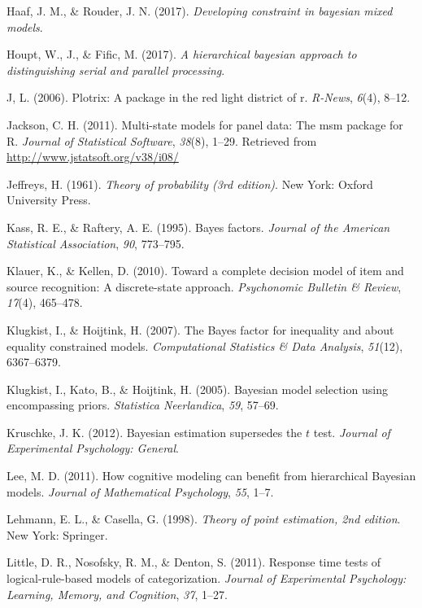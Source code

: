 \documentclass[english,man]{apa6}
\theoremstyle{definition}
\theoremstyle{definition}
\theoremstyle{remark}
\begin{document}
\hypertarget{ref-Haaf:Rouder:2017}{}
Haaf, J. M., \& Rouder, J. N. (2017). \emph{Developing constraint in
bayesian mixed models}.

\hypertarget{ref-Houpt:Fific:2017}{}
Houpt, W., J., \& Fific, M. (2017). \emph{A hierarchical bayesian
approach to distinguishing serial and parallel processing}.

\hypertarget{ref-R-plotrix}{}
J, L. (2006). Plotrix: A package in the red light district of r.
\emph{R-News}, \emph{6}(4), 8--12.

\hypertarget{ref-R-msm}{}
Jackson, C. H. (2011). Multi-state models for panel data: The msm
package for R. \emph{Journal of Statistical Software}, \emph{38}(8),
1--29. Retrieved from \url{http://www.jstatsoft.org/v38/i08/}

\hypertarget{ref-Jeffreys:1961}{}
Jeffreys, H. (1961). \emph{Theory of probability (3rd edition)}. New
York: Oxford University Press.

\hypertarget{ref-Kass:Raftery:1995}{}
Kass, R. E., \& Raftery, A. E. (1995). Bayes factors. \emph{Journal of
the American Statistical Association}, \emph{90}, 773--795.

\hypertarget{ref-Klauer:Kellen:2010}{}
Klauer, K., \& Kellen, D. (2010). Toward a complete decision model of
item and source recognition: A discrete-state approach.
\emph{Psychonomic Bulletin \& Review}, \emph{17}(4), 465--478.

\hypertarget{ref-Klugkist:Hoijtink:2007}{}
Klugkist, I., \& Hoijtink, H. (2007). The Bayes factor for inequality
and about equality constrained models. \emph{Computational Statistics \&
Data Analysis}, \emph{51}(12), 6367--6379.

\hypertarget{ref-Klugkist:etal:2005}{}
Klugkist, I., Kato, B., \& Hoijtink, H. (2005). Bayesian model selection
using encompassing priors. \emph{Statistica Neerlandica}, \emph{59},
57--69.

\hypertarget{ref-Kruschke:2012}{}
Kruschke, J. K. (2012). Bayesian estimation supersedes the \(t\) test.
\emph{Journal of Experimental Psychology: General}.

\hypertarget{ref-Lee:2011}{}
Lee, M. D. (2011). How cognitive modeling can benefit from hierarchical
Bayesian models. \emph{Journal of Mathematical Psychology}, \emph{55},
1--7.

\hypertarget{ref-Lehmann:Casella:1998}{}
Lehmann, E. L., \& Casella, G. (1998). \emph{Theory of point estimation,
2nd edition}. New York: Springer.

\hypertarget{ref-Little:etal:2011}{}
Little, D. R., Nosofsky, R. M., \& Denton, S. (2011). Response time
tests of logical-rule-based models of categorization. \emph{Journal of
Experimental Psychology: Learning, Memory, and Cognition}, \emph{37},
1--27.
\end{document}
